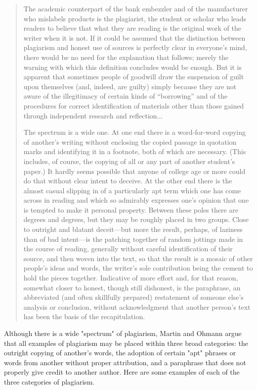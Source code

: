 \begin{quote}The academic counterpart of the bank embezzler and of the manufacturer
who mislabels products is the plagiarist, the student or scholar who leads readers
to believe that what they are reading is the original work of the writer when it
is not. If it could be assumed that the distinction between plagiarism and honest
use of sources is perfectly clear in everyone’s mind, there would be no need
for the explanation that follows; merely the warning with which this definition
concludes would be enough. But it is apparent that sometimes people of goodwill
draw the suspension of guilt upon themselves (and, indeed, are guilty) simply
because they are not aware of the illegitimacy of certain kinds of “borrowing”
and of the procedures for correct identification of materials other than those
gained through independent research and reflection...

The spectrum is a wide one. At one end there is a word-for-word copying of
another’s writing without enclosing the copied passage in quotation marks and
identifying it in a footnote, both of which are necessary. (This includes, of
course, the copying of all or any part of another student’s paper.) It hardly
seems possible that anyone of college age or more could do that without clear
intent to deceive. At the other end there is the almost casual slipping in of a
particularly apt term which one has come across in reading and which so admirably
expresses one’s opinion that one is tempted to make it personal property. Between
these poles there are degrees and degrees, but they may be roughly placed in two
groups. Close to outright and blatant deceit—but more the result, perhaps, of
laziness than of bad intent—is the patching together of random jottings made in
the course of reading, generally without careful identification of their source,
and then woven into the text, so that the result is a mosaic of other people’s
ideas and words, the writer’s sole contribution being the cement to hold the
pieces together. Indicative of more effort and, for that reason, somewhat closer
to honest, though still dishonest, is the paraphrase, an abbreviated (and often
skillfully prepared) restatement of someone else’s analysis or conclusion,
without acknowledgment that another person’s text has been the basis of the
recapitulation.\end{quote}

Although there is a wide "spectrum" of plagiarism, Martin and Ohmann argue
that all examples of plagiarism may be placed within three broad categories:
the outright copying of another's words, the adoption of certain "apt" phrases 
or words from another without proper attribution, and a paraphrase that does 
not properly give credit to another author. Here are some examples of each of the
three categories of plagiarism.

